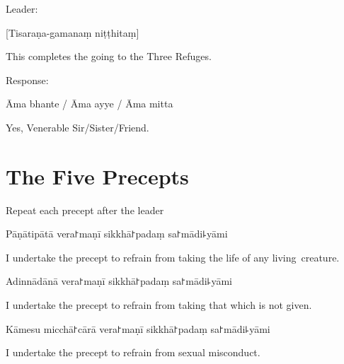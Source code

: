\begin{instruction}
  Leader:
\end{instruction}

[Tisaraṇa-gamanaṃ niṭṭhitaṃ]

\begin{english}
  This completes the going to the Three Refuges.
\end{english}

\begin{instruction}
  Response:
\end{instruction}

Āma bhante / Āma ayye / Āma mitta

\begin{english}
  Yes, Venerable Sir/Sister/Friend.
\end{english}

\chapter{The Five Precepts}%

\begin{instruction}
  Repeat each precept after the leader
\end{instruction}

\begin{precept}
  \setcounter{enumi}{0}
  \item Pāṇātipātā vera꜓maṇī sikkhā꜓padaṃ sa꜓mādi꜕yāmi
\end{precept}

\begin{english}
  I undertake the precept to refrain from taking the life of any living~creature.
\end{english}

\begin{precept}
  \setcounter{enumi}{1}
  \item Adinnādānā vera꜓maṇī sikkhā꜓padaṃ sa꜓mādi꜕yāmi
\end{precept}

\begin{english}
  I undertake the precept to refrain from taking that which is not given.
\end{english}

\begin{precept}
  \setcounter{enumi}{2}
  \item Kāmesu micchā꜓cārā vera꜓maṇī sikkhā꜓padaṃ sa꜓mādi꜕yāmi
\end{precept}

\begin{english}
  I undertake the precept to refrain from sexual misconduct.
\end{english}

